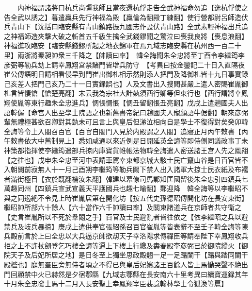 　　内神福謂諸將曰杭兵尚彊我師且當夜還杭俘走告全武神福命勿追【逸杭俘使之告全武以誘之】暮遣羸兵先行神福為殿【羸倫為翻殿丁練翻】使行營都尉呂師造伏兵青山下【沈括曰臨安縣有青山鎮路振九國志作設伏青山路】全武素輕神福出兵追之神福師造夾擊大破之斬首五千級生擒全武錢鏐聞之驚泣曰喪我良將【喪息浪翻】神福進攻臨安【臨安縣錢鏐所起之地衣錦軍在焉九域志臨安縣在杭州西一百二十里】兩浙將秦昶帥衆三千降之【帥讀曰率】　韓全誨聞朱全忠將至丁酉令李繼筠李彦弼等勒兵劫上請幸鳳翔宫禁諸門皆增兵防守　【考異曰按金鑾記二十日入直隔夜崔公傳語明日請相看侵早到門崔出御札相示然則添人把門及降御札皆十九日事實録己亥差人把門己亥乃二十一日實録誤也】人及文書出入搜閲甚嚴上遣人密賜崔胤御札言皆悽愴【愴楚亮翻】末云我為宗社大計埶須西行卿等但東行也【西行謂將幸鳳翔使胤等東行趣朱全忠進兵】惆悵惆悵【惆丑留翻悵丑亮翻】戊戌上遣趙國夫人出語韓偓【命宫人出至學士院語之也新舊書帝紀曰趙國夫人寵顔語牛倨翻】朝來彦弼輩無禮極甚欲召卿對其埶未可且言上與皇后但涕泣相向自是學士不復得對矣癸卯韓全誨等令上入閤召百官【百官自閤門入見於内殿謂之入閤】追寢正月丙午敕書【丙午敕書依大中舊制見上】悉如咸通以來近例是日開延英全誨等即侍側同議政事丁未神策都指揮使李繼筠遣部兵掠内庫寶貨帷帳法物韓全誨遣人密送諸王宫人先之鳳翔【之往也】戊申朱全忠至河中表請車駕幸東都京城大駭士民亡竄山谷是日百官皆不入朝闕前寂無人十一月己酉朔李繼筠等勒兵闕下禁人出入諸軍大掠士民衣紙及布襦者滿街極目【衣於既翻襦汝朱翻】韓建以幕僚司馬鄴知匡國留後朱全忠引四鎮兵七萬趣同州【四鎮兵宣武宣義天平護國兵也趣七喻翻】鄴迎降　韓全誨等以李繼昭不與之同遏絶不令見上時崔胤居第在開化坊【按五代史孫德昭傳開化坊在長安東街】繼昭帥所部六十餘人【六十當作六千帥讀曰率】及關東諸道兵在京師者共守衛之【史言崔胤所以不死於羣閹之手】百官及士民避亂者皆往依之【依李繼昭之兵以避禁兵及岐兵暴掠】庚戌上遣供奉官張紹孫召百官崔胤等皆表辭不至壬子韓全誨等陳兵殿前言於上曰全忠以大兵逼京師欲刼天子幸洛陽求傳禪臣等請奉陛下幸鳳翔收兵拒之上不許杖劒登乞巧樓全誨等逼上下樓上行纔及夀春殿李彦弼已於御院縱火【御院天子及后妃所居之地】是日冬至上獨坐思政殿翹一足一足蹋闌干【蹋與踏同闌干殿檻也】庭無羣臣旁無侍者頃之不得已與皇后妃嬪諸王百餘人皆上馬慟哭聲不絶出門回顧禁中火已赫然是夕宿鄠縣【九域志鄠縣在長安南六十里考異曰續寶運録其年十月朱全忠發士馬十二月入長安聖上幸鳳翔宰臣裴諗翰林學士令狐渙等扈】

